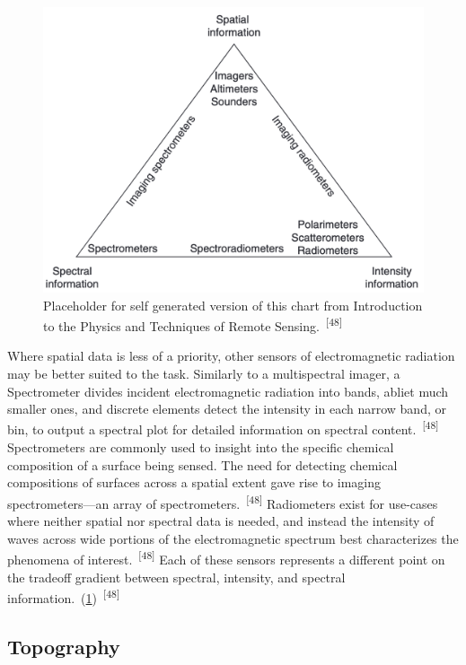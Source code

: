 \documentclass{article}
\begin{document}
\begin{figure}
    \centering
    \includegraphics[width=0.6\linewidth]{images/remote-sensor-tradeoff.png}
    \caption{Placeholder for self generated version of this chart from Introduction to the Physics and Techniques of Remote Sensing.~\textsuperscript{[48]}}
    \label{figure14}
\end{figure}

\par{Where spatial data is less of a priority, other sensors of electromagnetic radiation may be better suited to the task. Similarly to a multispectral imager, a Spectrometer divides incident electromagnetic radiation into bands, abliet much smaller ones, and discrete elements detect the intensity in each narrow band, or bin, to output a spectral plot for detailed information on spectral content.~\textsuperscript{[48]} Spectrometers are commonly used to insight into the specific chemical composition of a surface being sensed. The need for detecting chemical compositions of surfaces across a spatial extent gave rise to imaging spectrometers---an array of spectrometers.~\textsuperscript{[48]} Radiometers exist for use-cases where neither spatial nor spectral data is needed, and instead the intensity of waves across wide portions of the electromagnetic spectrum best characterizes the phenomena of interest.~\textsuperscript{[48]} Each of these sensors represents a different point on the tradeoff gradient between spectral, intensity, and spectral information.~(\cref{figure14})~\textsuperscript{[48]}}


\subsection{Topography}
\end{document}
